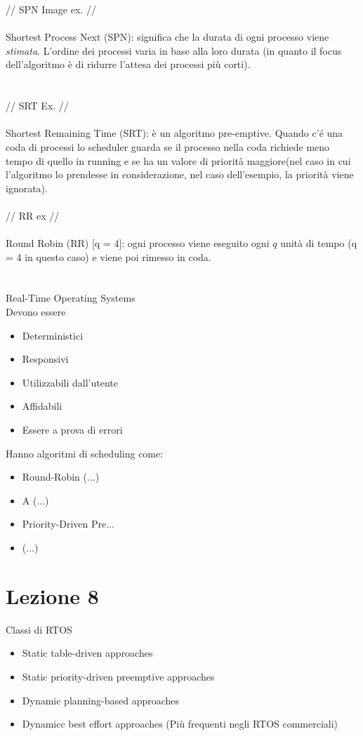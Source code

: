 \documentclass[12pt, a4paper]{article}
\begin{document}
	// SPN Image ex. // \\\\
	Shortest Process Next (SPN): significa che la durata di ogni processo viene \textit{stimata}. L'ordine dei processi varia in base alla loro durata (in quanto il focus dell'algoritmo è di ridurre l'attesa dei processi più corti).
	\\ \\ \\
	// SRT Ex.  // \\ \\
	Shortest Remaining Time (SRT): è un algoritmo pre-emptive. Quando c'é una coda di processi lo scheduler guarda se il processo nella coda richiede meno tempo di quello in running e se ha un valore di priorità maggiore(nel caso in cui l'algoritmo lo prendesse in considerazione, nel caso dell'esempio, la priorità viene ignorata). \\ \\ 
	// RR ex // \\ \\
	Round Robin (RR) [q = 4]: ogni processo viene eseguito ogni $q$ unità di tempo (q = 4 in questo caso) e viene poi rimesso in coda. 
	\\ \\ \\ 
	Real-Time Operating Systems\\ 
	Devono essere
	\begin{itemize}
		\item Deterministici
		\item Responsivi 
		\item Utilizzabili dall'utente
		\item Affidabili
		\item Essere a prova di errori
	\end{itemize}
	Hanno algoritmi di scheduling come:
	\begin{itemize}
		\item Round-Robin (...)
		\item A (...)
		\item Priority-Driven Pre...
		\item (...)
	\end{itemize}

	
	\section*{Lezione 8}
	
	Classi di RTOS
	\begin{itemize}
		\item Static table-driven approaches
		\item Static priority-driven preemptive approaches
		\item Dynamic planning-based approaches
		\item Dynamicc best effort approaches (Più frequenti negli RTOS commerciali)
	\end{itemize}
\end{document}
